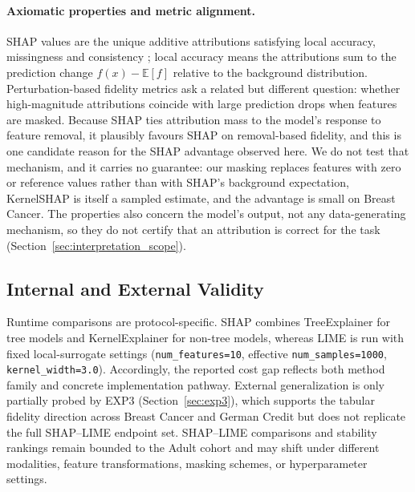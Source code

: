 \documentclass[10pt]{article}
\begin{document}
\paragraph{Axiomatic properties and metric alignment.}
SHAP values are the unique additive attributions satisfying local accuracy,
missingness and consistency \citep{lundberg2017unified}; local accuracy means
the attributions sum to the prediction change $f(x) - \mathbb{E}[f]$ relative
to the background distribution. Perturbation-based fidelity metrics ask a
related but different question: whether high-magnitude attributions coincide
with large prediction drops when features are masked. Because SHAP ties
attribution mass to the model's response to feature removal, it plausibly
favours SHAP on removal-based fidelity, and this is one candidate reason for
the SHAP advantage observed here. We do not test that mechanism, and it
carries no guarantee: our masking replaces features with zero or reference
values rather than with SHAP's background expectation, KernelSHAP is itself
a sampled estimate, and the advantage is small on Breast Cancer. The
properties also concern the model's output, not any data-generating
mechanism, so they do not certify that an attribution is correct for the
task (Section~\ref{sec:interpretation_scope}).

\subsection{Internal and External Validity}

Runtime comparisons are protocol-specific. SHAP combines TreeExplainer
for tree models and KernelExplainer for non-tree models, whereas LIME is
run with fixed local-surrogate settings (\texttt{num\_features=10},
effective \texttt{num\_samples=1000}, \texttt{kernel\_width=3.0}).
Accordingly, the reported cost gap reflects both method family and
concrete implementation pathway. External generalization is only partially
probed by EXP3 (Section~\ref{sec:exp3}), which supports the tabular
fidelity direction across Breast Cancer and German Credit but does not
replicate the full SHAP--LIME endpoint set. SHAP--LIME comparisons and
stability rankings remain bounded to the Adult cohort and may shift under
different modalities, feature transformations, masking schemes, or
hyperparameter settings.
\end{document}
